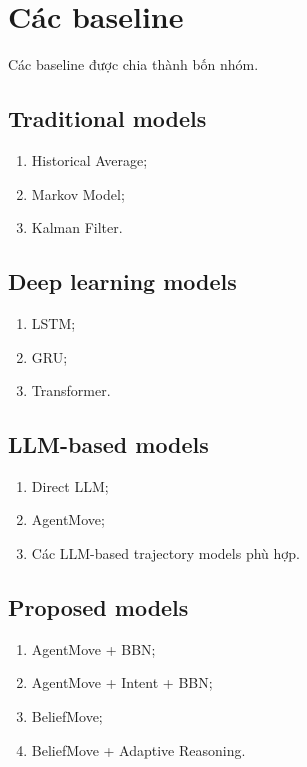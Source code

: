 \documentclass[11pt,a4paper]{article}
\begin{document}
	\section{Các baseline}
	
	Các baseline được chia thành bốn nhóm.
	
	\subsection{Traditional models}
	
	\begin{enumerate}
		\item Historical Average;
		\item Markov Model;
		\item Kalman Filter.
	\end{enumerate}
	
	\subsection{Deep learning models}
	
	\begin{enumerate}
		\item LSTM;
		\item GRU;
		\item Transformer.
	\end{enumerate}
	
	\subsection{LLM-based models}
	
	\begin{enumerate}
		\item Direct LLM;
		\item AgentMove;
		\item Các LLM-based trajectory models phù hợp.
	\end{enumerate}
	
	\subsection{Proposed models}
	
	\begin{enumerate}
		\item AgentMove + BBN;
		\item AgentMove + Intent + BBN;
		\item BeliefMove;
		\item BeliefMove + Adaptive Reasoning.
	\end{enumerate}
	
\end{document}
